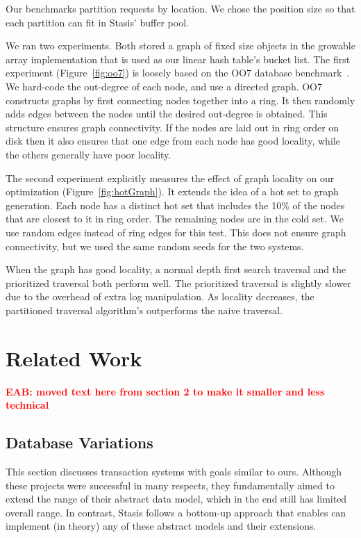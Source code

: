 \documentclass[letterpaper,twocolumn,10pt]{article}
\newcommand{\yad}{Stasis\xspace}
\newcommand{\yads}{Stasis'\xspace}
\newcommand{\eab}[1]{\textcolor{red}{\bf EAB: #1}}
\begin{document}
Our benchmarks partition requests by location.  We chose the
position size so that each partition can fit in \yads buffer pool.

We ran two experiments.  Both stored a graph of fixed size objects in
the growable array implementation that is used as our linear
hash table's bucket list.
The first experiment (Figure~\ref{fig:oo7})
is loosely based on the OO7 database benchmark~\cite{oo7}.  We
hard-code the out-degree of each node, and use a directed graph.  OO7
constructs graphs by first connecting nodes together into a ring.
It then randomly adds edges between the nodes until the desired
out-degree is obtained.  This structure ensures graph connectivity.
If the nodes are laid out in ring order on disk then it also ensures that
one edge from each node has good locality, while the others generally
have poor locality.

The second experiment explicitly measures the effect of graph locality
on our optimization (Figure~\ref{fig:hotGraph}). It extends the idea
of a hot set to graph generation.  Each node has a distinct hot set
that includes the 10\% of the nodes that are closest to it in ring
order.  The remaining nodes are in the cold set.  We use random edges
instead of ring edges for this test.  This does not ensure graph
connectivity, but we used the same random seeds for the two systems.

When the graph has good locality, a normal depth first search
traversal and the prioritized traversal both perform well.  The
prioritized traversal is slightly slower due to the overhead of extra
log manipulation. As locality decreases, the partitioned traversal
algorithm's outperforms the naive traversal.


\section{Related Work}
\label{related-work}


\eab{moved text here from section 2 to make it smaller and less technical}

\subsection{Database Variations} 
\label{sec:otherDBs}

This section discusses transaction systems with goals
similar to ours.  Although these projects were successful in many
respects, they fundamentally aimed to extend the range of their
abstract data model, which in the end still has limited overall range.
In contrast, \yad follows a bottom-up approach that enables can
implement (in theory) any of these abstract models and their extensions.
\end{document}
